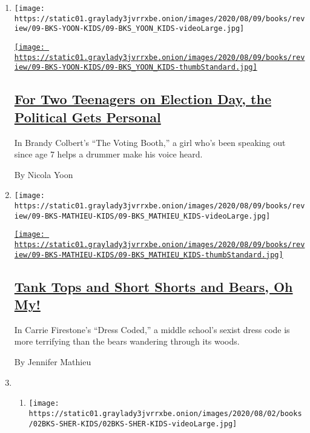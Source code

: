 \begin{enumerate}
\def\labelenumi{\arabic{enumi}.}
\item
  \texttt{[image: https://static01.graylady3jvrrxbe.onion/images/2020/08/09/books/review/09-BKS-YOON-KIDS/09-BKS\_YOON\_KIDS-videoLarge.jpg]}

  \href{/2020/08/01/books/review/brandy-colbert-the-voting-booth.html}{\texttt{[image: https://static01.graylady3jvrrxbe.onion/images/2020/08/09/books/review/09-BKS-YOON-KIDS/09-BKS\_YOON\_KIDS-thumbStandard.jpg]}}

  \hypertarget{for-two-teenagers-on-election-day-the-political-gets-personal}{%
  \subsection{\texorpdfstring{\href{/2020/08/01/books/review/brandy-colbert-the-voting-booth.html}{For
  Two Teenagers on Election Day, the Political Gets
  Personal}}{For Two Teenagers on Election Day, the Political Gets Personal}}\label{for-two-teenagers-on-election-day-the-political-gets-personal}}

  In Brandy Colbert's ``The Voting Booth,'' a girl who's been speaking
  out since age 7 helps a drummer make his voice heard.

  By Nicola Yoon
\item
  \texttt{[image: https://static01.graylady3jvrrxbe.onion/images/2020/08/09/books/review/09-BKS-MATHIEU-KIDS/09-BKS\_MATHIEU\_KIDS-videoLarge.jpg]}

  \href{/2020/08/01/books/review/carrie-firestone-dress-coded.html}{\texttt{[image: https://static01.graylady3jvrrxbe.onion/images/2020/08/09/books/review/09-BKS-MATHIEU-KIDS/09-BKS\_MATHIEU\_KIDS-thumbStandard.jpg]}}

  \hypertarget{tank-tops-and-short-shorts-and-bears-oh-my}{%
  \subsection{\texorpdfstring{\href{/2020/08/01/books/review/carrie-firestone-dress-coded.html}{Tank
  Tops and Short Shorts and Bears, Oh
  My!}}{Tank Tops and Short Shorts and Bears, Oh My!}}\label{tank-tops-and-short-shorts-and-bears-oh-my}}

  In Carrie Firestone's ``Dress Coded,'' a middle school's sexist dress
  code is more terrifying than the bears wandering through its woods.

  By Jennifer Mathieu
\item
  \begin{enumerate}
  \def\labelenumii{\arabic{enumii}.}
  \item
    \texttt{[image: https://static01.graylady3jvrrxbe.onion/images/2020/08/02/books/02BKS-SHER-KIDS/02BKS-SHER-KIDS-videoLarge.jpg]}


\end{enumerate}
\end{enumerate}
